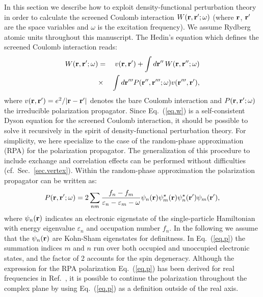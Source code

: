 \documentclass[twocolumn,prb,showpacs,superscriptaddress]{revtex4}
\def\w{\omega}
\def\E{\varepsilon}
\def\r{{\bf r}}
\def\rp{{\bf r^\prime}}
\def\rpp{{\bf r^{\prime\prime}}}
\def\rppp{{\bf r^{\prime\prime\prime}}}
\begin{document}
In this section we describe how to exploit density-functional
perturbation theory in order to calculate the screened Coulomb interaction
$W(\r,\rp;\w)$ (where $\r$, $\rp$ are the space variables and $\w$ is the
excitation frequency). We assume Rydberg atomic units throughout this manuscript. 
The Hedin's equation which defines the screened Coulomb 
interaction reads:\cite{hl}
  \begin{eqnarray}\label{eq.w}
  W(\r,\rp;\w) & = & v(\r,\rp) + \int d\rpp \,W(\r,\rpp;\w)  \nonumber \\
   & \times & \int d\rppp P(\rpp,\rppp;\w) v(\rppp,\rp),
  \end{eqnarray}
where $v(\r,\rp)=e^2/|\r-\rp|$ denotes the bare Coulomb interaction and 
$P(\r,\rp;\w)$ the irreducible polarization propagator. 
Since Eq.\ (\ref{eq.w}) is a self-consistent Dyson equation for the
screened Coulomb interaction, it should be possible to solve it
recursively in the spirit of density-functional perturbation theory.
For simplicity, we here specialize to the case of the random-phase approximation (RPA)
for the polarization propagator. 
The generalization of this procedure to include exchange and correlation
effects can be performed without difficulties (cf.\ Sec.\ \ref{sec.vertex}).
Within the random-phase approximation the polarization propagator can be written as:\cite{hl}
  \begin{equation}\label{eq.p}
  P(\r,\rp;\w) = 2\sum_{n m} \frac{f_n-f_m}{\E_n-\E_m-\w} 
  \psi_n(\r)\psi_m^\star(\r)  \psi_n^\star(\rp)\psi_m(\rp),
  \end{equation}
where $\psi_n(\r)$ indicates an electronic eigenstate of the
single-particle Hamiltonian 
with energy eigenvalue $\E_n$ and occupation number $f_n$. 
In the following we assume that the $\psi_n(\r)$ are Kohn-Sham
eigenstates for definitness.
In Eq.\ (\ref{eq.p}) the summation indices $m$ and $n$ run over
both occupied and unoccupied electronic states, and the factor of 2 accounts for the
spin degeneracy.\cite{hl}
Although the expression for the RPA polarization Eq.~(\ref{eq.p})
has been derived for real frequencies in Ref.\ , it
is possible to continue the polarization throughout the complex 
plane by using Eq.~(\ref{eq.p}) as a definition outside of the real axis.
\end{document}
